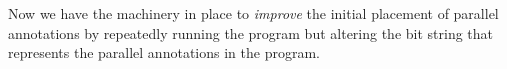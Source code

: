 Now we have the machinery in place to \emph{improve} the initial placement
of parallel annotations by repeatedly running the program but altering
the bit string that represents the parallel annotations in the program.

%
